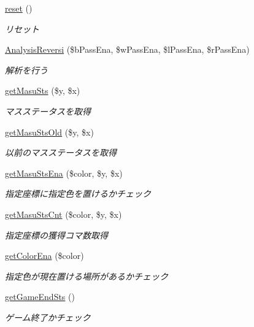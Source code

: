 \begin{DoxyCompactItemize}
\hyperlink{class_reversi_a4a20559544fdf4dcb457e258dc976cf8}{reset} ()
\begin{DoxyCompactList}\small\item\em リセット \end{DoxyCompactList}\item 
\hyperlink{class_reversi_a1e2f4c432c1e407c4dbec20f4ee1b3b7}{Analysis\+Reversi} (\$b\+Pass\+Ena, \$w\+Pass\+Ena, \$l\+Pass\+Ena, \$r\+Pass\+Ena)
\begin{DoxyCompactList}\small\item\em 解析を行う \end{DoxyCompactList}\item 
\hyperlink{class_reversi_a1baed538e7a503cd51850d368b9e65f7}{get\+Masu\+Sts} (\$y, \$x)
\begin{DoxyCompactList}\small\item\em マスステータスを取得 \end{DoxyCompactList}\item 
\hyperlink{class_reversi_a1688a929d3917e19510f6501c42d6a2b}{get\+Masu\+Sts\+Old} (\$y, \$x)
\begin{DoxyCompactList}\small\item\em 以前のマスステータスを取得 \end{DoxyCompactList}\item 
\hyperlink{class_reversi_a22088e18c7f837f49093595261c30e4e}{get\+Masu\+Sts\+Ena} (\$color, \$y, \$x)
\begin{DoxyCompactList}\small\item\em 指定座標に指定色を置けるかチェック \end{DoxyCompactList}\item 
\hyperlink{class_reversi_a10bfc13effc2db9a681a2906792be453}{get\+Masu\+Sts\+Cnt} (\$color, \$y, \$x)
\begin{DoxyCompactList}\small\item\em 指定座標の獲得コマ数取得 \end{DoxyCompactList}\item 
\hyperlink{class_reversi_aead5ee041feb6ac2609266614ea06f78}{get\+Color\+Ena} (\$color)
\begin{DoxyCompactList}\small\item\em 指定色が現在置ける場所があるかチェック \end{DoxyCompactList}\item 
\hyperlink{class_reversi_aab9985c789e464de6cf99d7d725cb5a3}{get\+Game\+End\+Sts} ()
\begin{DoxyCompactList}\small\item\em ゲーム終了かチェック \end{DoxyCompactList}\item 

\end{DoxyCompactItemize}
